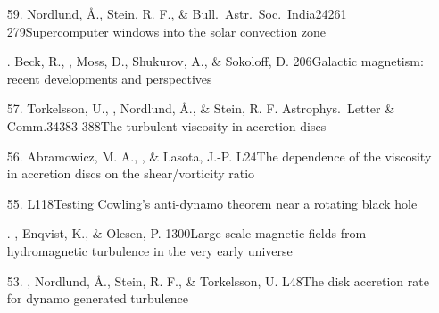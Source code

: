 \begin{itemize}
\item[59.]
Nordlund, \AA., Stein, R. F., \& \Brandenburg{}
{Bull.\ Astr.\ Soc.\ India}{24}{261}
{279}{Supercomputer windows into the solar convection zone}

\item[\important 58.]
Beck, R., \Brandenburg, Moss, D., Shukurov, A., \&
Sokoloff, D.
{206}{Galactic magnetism: recent developments and perspectives}

\item[57.]
Torkelsson, U., \Brandenburg, Nordlund, \AA., \& Stein, R. F.
{Astrophys.\ Letter \& Comm.}{34}{383}
{388}{The turbulent viscosity in accretion discs}

\item[56.]
Abramowicz, M. A., \Brandenburg, \& Lasota, J.-P.
{L24}{The dependence of the viscosity in accretion discs on the
shear/vorticity ratio}

\item[55.]
\Brandenburg{}
{L118}{Testing Cowling's anti-dynamo theorem near a rotating black hole}

\item[\important 54.]
\Brandenburg, Enqvist, K., \& Olesen, P.
{1300}{Large-scale magnetic fields from hydromagnetic turbulence in the very early universe}

\item[53.]
\Brandenburg, Nordlund, \AA., Stein, R. F., \&
Torkelsson, U.
{L48}{The disk accretion rate for dynamo generated turbulence}


\end{itemize}
